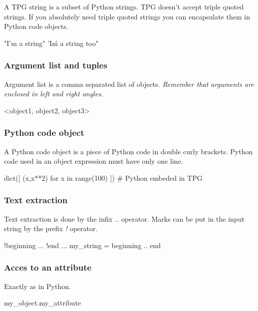 A TPG string is a subset of Python strings.
TPG doesn't accept triple quoted strings.
If you absolutely need triple quoted strings you can encapsulate them in Python code objects.

\begin{verbatimtab}[4]
	"I'm a string"
	'I\'m a string too"
\end{verbatimtab}

\subsubsection{Argument list and tuples}

Argument list is a comma separated list of objects.
\emph{Remember that arguments are enclosed in left and right angles.}

\begin{verbatimtab}[4]
	<object1, object2, object3>
\end{verbatimtab}

\subsubsection{Python code object}

A Python code object is a piece of Python code in double curly brackets.
Python code used in an object expression must have only one line.

\begin{verbatimtab}[4]
	{{ dict([ (x,x**2) for x in range(100) ]) # Python embeded in TPG }}
\end{verbatimtab}

\subsubsection{Text extraction}

Text extraction is done by the infix \emph{..} operator.
Marks can be put in the input string by the prefix \emph{!} operator.

\begin{verbatimtab}[4]
	!beginning
	...
	!end
	...
	my_string = beginning .. end
\end{verbatimtab}

\subsubsection{Acces to an attribute}

Exactly as in Python.

\begin{verbatimtab}[4]
	my_object.my_attribute
\end{verbatimtab}

